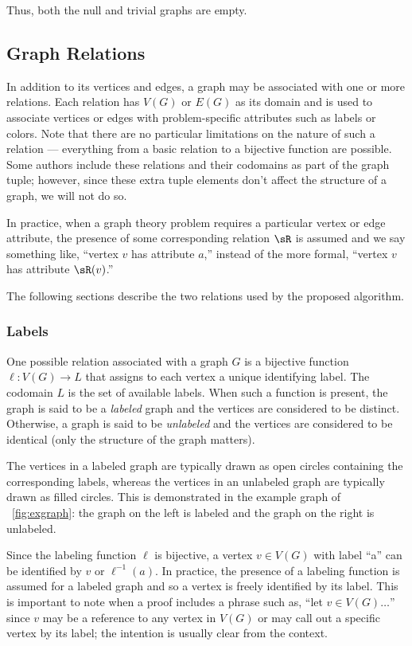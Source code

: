 Thus, both the null and trivial graphs are empty.

\subsection{Graph Relations}\label{sec:sub:relations}

In addition to its vertices and edges, a graph may be associated with one or more relations.  Each relation has
\(V(G)\) or \(E(G)\) as its domain and is used to associate vertices or edges with problem-specific attributes such
as labels or colors.  Note that there are no particular limitations on the nature of such a relation --- everything
from a basic relation to a bijective function are possible.  Some authors include these relations and their
codomains as part of the graph tuple; however, since these extra tuple elements don't affect the structure of a
graph, we will not do so.

In practice, when a graph theory problem requires a particular vertex or edge attribute, the presence of some
corresponding relation \(\sR\) is assumed and we say something like, ``vertex \(v\) has attribute \(a\),'' instead
of the more formal, ``vertex \(v\) has attribute \(\sR(v)\).''

The following sections describe the two relations used by the proposed algorithm.

\subsubsection{Labels}\label{sec:sub:sub:labels}

One possible relation associated with a graph \(G\) is a bijective function \(\ell:V(G)\to L\) that assigns to each
vertex a unique identifying label.  The codomain \(L\) is the set of available labels.  When such a function is
present, the graph is said to be a \emph{labeled} graph and the vertices are considered to be distinct.  Otherwise,
a graph is said to be \emph{unlabeled} and the vertices are considered to be identical (only the structure of the
graph matters).

The vertices in a labeled graph are typically drawn as open circles containing the corresponding labels, whereas
the vertices in an unlabeled graph are typically drawn as filled circles.  This is demonstrated in the example
graph of \figurename~\ref{fig:exgraph}: the graph on the left is labeled and the graph on the right is unlabeled.

Since the labeling function \(\ell\) is bijective, a vertex \(v\in V(G)\) with label ``a'' can be identified by
\(v\) or \(\ell^{-1}(a)\).  In practice, the presence of a labeling function is assumed for a labeled graph and so
a vertex is freely identified by its label.  This is important to note when a proof includes a phrase such as,
``let \(v\in V(G)\ldots\)'' since \(v\) may be a reference to any vertex in \(V(G)\) or may call out a specific
vertex by its label; the intention is usually clear from the context.

